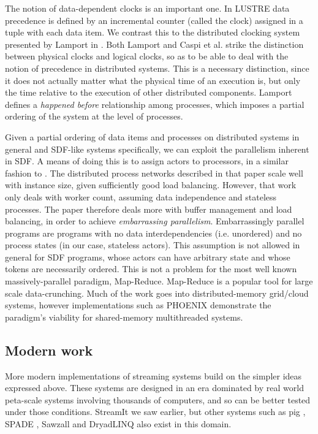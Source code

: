 The notion of data-dependent clocks is an important one.
In LUSTRE data precedence is defined by an incremental counter (called the clock) assigned in a tuple with each data item.
We contrast this to the distributed clocking system presented by Lamport in \cite{lam78}.
Both Lamport and Caspi et al. strike the distinction between physical clocks and logical clocks, so as to be able to deal with the notion of precedence in distributed systems.
This is a necessary distinction, since it does not actually matter what the physical time of an execution is, but only the time relative to the execution of other distributed components.
Lamport defines a {\em happened before} relationship among processes, which imposes a partial ordering of the system at the level of processes.

Given a partial ordering of data items and processes on distributed systems in general and SDF-like systems specifically, we can exploit the parallelism inherent in SDF.
A means of doing this is to assign actors to processors, in a similar fashion to \cite{par03}.
The distributed process networks described in that paper scale well with instance size, given sufficiently good load balancing.
However, that work only deals with worker count, assuming data independence and stateless processes.
The paper therefore deals more with buffer management and load balancing, in order to achieve {\em embarrassing parallelism}.
Embarrassingly parallel programs are programs with no data interdependencies (i.e. unordered) and no process states (in our case, stateless actors).
This assumption is not allowed in general for SDF programs, whose actors can have arbitrary state and whose tokens are necessarily ordered.
This is not a problem for the most well known massively-parallel paradigm, Map-Reduce.
Map-Reduce \cite{dea08} is a popular tool for large scale data-crunching.
Much of the work goes into distributed-memory grid/cloud systems, however implementations such as PHOENIX \cite{ran07} demonstrate the paradigm's viability for shared-memory multithreaded systems.

\subsection{Modern work}

More modern implementations of streaming systems build on the simpler ideas expressed above.
These systems are designed in an era dominated by real world peta-scale systems involving thousands of computers, and so can be better tested under those conditions.
StreamIt \cite{thies01, thies02, thies10} we saw earlier, but other systems such as pig \cite{ols08}, SPADE \cite{ged08}, Sawzall \cite{pik05} and DryadLINQ \cite{yu08} also exist in this domain.

